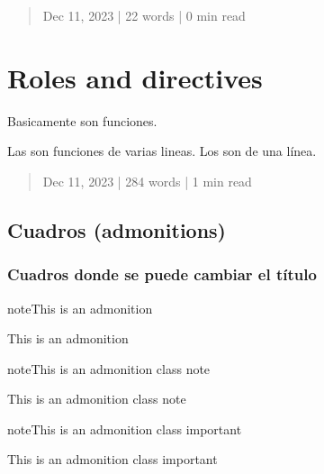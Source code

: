 \documentclass[letterpaper,10pt,english]{jupyterBook}
\begin{document}
\sphinxstepscope
\begin{quote}

\sphinxAtStartPar
Dec 11, 2023 | 22 words | 0 min read
\end{quote}


\chapter{Roles and directives}
\label{\detokenize{docs/02_00_Roles_and_directives:roles-and-directives}}\label{\detokenize{docs/02_00_Roles_and_directives::doc}}
\sphinxAtStartPar
Basicamente son funciones. 

\sphinxAtStartPar
Las  son funciones de varias lineas. Los  son de una línea.

\sphinxstepscope
\begin{quote}

\sphinxAtStartPar
Dec 11, 2023 | 284 words | 1 min read
\end{quote}


\section{Cuadros (admonitions)}
\label{\detokenize{docs/02_01_Cuadros:cuadros-admonitions}}\label{\detokenize{docs/02_01_Cuadros::doc}}

\subsection{Cuadros donde se puede cambiar el título}
\label{\detokenize{docs/02_01_Cuadros:cuadros-donde-se-puede-cambiar-el-titulo}}
\begin{sphinxadmonition}{note}{This is an admonition}

\sphinxAtStartPar
This is an admonition
\end{sphinxadmonition}

\begin{sphinxadmonition}{note}{This is an admonition class note}

\sphinxAtStartPar
This is an admonition class note
\end{sphinxadmonition}

\begin{sphinxadmonition}{note}{This is an admonition class important}

\sphinxAtStartPar
This is an admonition class important
\end{sphinxadmonition}
\end{document}
